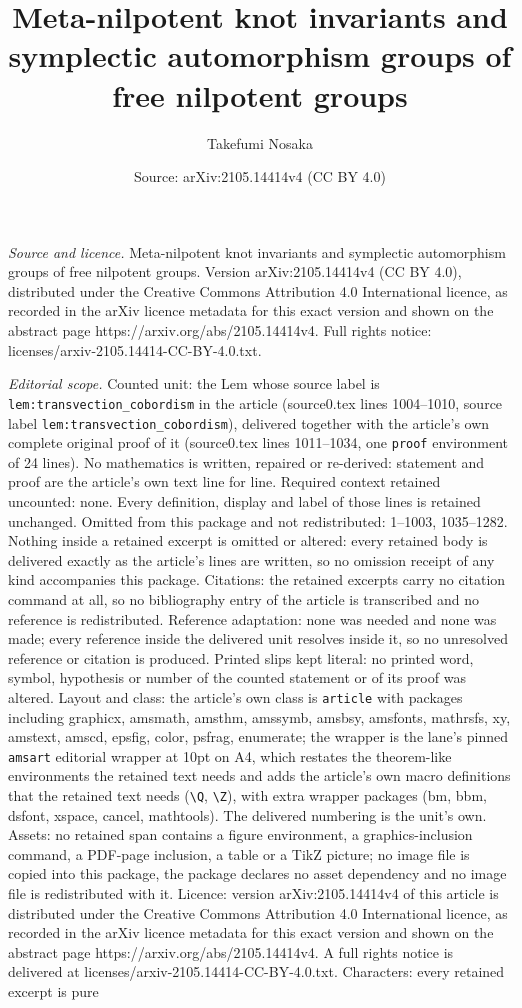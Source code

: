 \documentclass[10pt,a4paper]{amsart}
\title[Meta-nilpotent knot invariants and symplectic automorphism g]{Meta-nilpotent knot invariants and symplectic automorphism groups of free nilpotent groups}
\author{Takefumi Nosaka}
\date{Source: arXiv:2105.14414v4 (CC BY 4.0)}
\begin{document}
\maketitle

\noindent\emph{Source and licence.} Meta-nilpotent knot invariants and symplectic automorphism groups of free nilpotent groups. Version arXiv:2105.14414v4 (CC BY 4.0), distributed under the Creative Commons Attribution 4.0 International licence, as recorded in the arXiv licence metadata for this exact version and shown on the abstract page https://arxiv.org/abs/2105.14414v4. Full rights notice: licenses/arxiv-2105.14414-CC-BY-4.0.txt.\par\smallskip

\noindent\textit{Editorial scope.} Counted unit: the Lem whose source label is \texttt{lem:transvection\_cobordism} in the article (source0.tex lines 1004--1010, source label \texttt{lem:transvection\_cobordism}), delivered together with the article's own complete original proof of it (source0.tex lines 1011--1034, one \texttt{proof} environment of 24 lines). No mathematics is written, repaired or re-derived: statement and proof are the article's own text line for line. Required context retained uncounted: none. Every definition, display and label of those lines is retained unchanged. Omitted from this package and not redistributed: 1--1003, 1035--1282. Nothing inside a retained excerpt is omitted or altered: every retained body is delivered exactly as the article's lines are written, so no omission receipt of any kind accompanies this package. Citations: the retained excerpts carry no citation command at all, so no bibliography entry of the article is transcribed and no reference is redistributed. Reference adaptation: none was needed and none was made; every reference inside the delivered unit resolves inside it, so no unresolved reference or citation is produced. Printed slips kept literal: no printed word, symbol, hypothesis or number of the counted statement or of its proof was altered. Layout and class: the article's own class is \texttt{article} with packages including graphicx, amsmath, amsthm, amssymb, amsbsy, amsfonts, mathrsfs, xy, amstext, amscd, epsfig, color, psfrag, enumerate; the wrapper is the lane's pinned \texttt{amsart} editorial wrapper at 10pt on A4, which restates the theorem-like environments the retained text needs and adds the article's own macro definitions that the retained text needs (\texttt{\textbackslash Q}, \texttt{\textbackslash Z}), with extra wrapper packages (bm, bbm, dsfont, xspace, cancel, mathtools). The delivered numbering is the unit's own. Assets: no retained span contains a figure environment, a graphics-inclusion command, a PDF-page inclusion, a table or a TikZ picture; no image file is copied into this package, the package declares no asset dependency and no image file is redistributed with it. Licence: version arXiv:2105.14414v4 of this article is distributed under the Creative Commons Attribution 4.0 International licence, as recorded in the arXiv licence metadata for this exact version and shown on the abstract page https://arxiv.org/abs/2105.14414v4. A full rights notice is delivered at licenses/arxiv-2105.14414-CC-BY-4.0.txt. Characters: every retained excerpt is pure 
\end{document}
